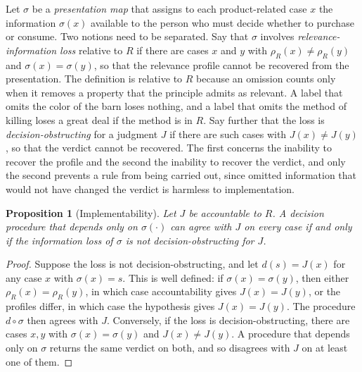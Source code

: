 \documentclass[11pt]{article}
\theoremstyle{definition}
\theoremstyle{plain}
\newtheorem{proposition}[definition]{Proposition}
\theoremstyle{definition}
\newcommand{\Judg}{J}
\newcommand{\prof}{\rho}
\newcommand{\Rel}{R}
\begin{document}
Let $\sigma$ be a \emph{presentation map} that assigns to each product-related case $x$ the information $\sigma(x)$ available to the person who must decide whether to purchase or consume. Two notions need to be separated. Say that $\sigma$ involves \emph{relevance-information loss} relative to $\Rel$ if there are cases $x$ and $y$ with $\prof_{\Rel}(x)\neq\prof_{\Rel}(y)$ and $\sigma(x)=\sigma(y)$, so that the relevance profile cannot be recovered from the presentation. The definition is relative to $\Rel$ because an omission counts only when it removes a property that the principle admits as relevant. A label that omits the color of the barn loses nothing, and a label that omits the method of killing loses a great deal if the method is in $\Rel$. Say further that the loss is \emph{decision-obstructing} for a judgment $\Judg$ if there are such cases with $\Judg(x)\neq\Judg(y)$, so that the verdict cannot be recovered. The first concerns the inability to recover the profile and the second the inability to recover the verdict, and only the second prevents a rule from being carried out, since omitted information that would not have changed the verdict is harmless to implementation.

\begin{proposition}[Implementability]\label{prop:implementability}
Let $\Judg$ be accountable to $\Rel$. A decision procedure that depends only on $\sigma(\cdot)$ can agree with $\Judg$ on every case if and only if the information loss of $\sigma$ is not decision-obstructing for $\Judg$.
\end{proposition}

\begin{proof}
Suppose the loss is not decision-obstructing, and let $d(s)=\Judg(x)$ for any case $x$ with $\sigma(x)=s$. This is well defined: if $\sigma(x)=\sigma(y)$, then either $\prof_{\Rel}(x)=\prof_{\Rel}(y)$, in which case accountability gives $\Judg(x)=\Judg(y)$, or the profiles differ, in which case the hypothesis gives $\Judg(x)=\Judg(y)$. The procedure $d\circ\sigma$ then agrees with $\Judg$. Conversely, if the loss is decision-obstructing, there are cases $x,y$ with $\sigma(x)=\sigma(y)$ and $\Judg(x)\neq\Judg(y)$. A procedure that depends only on $\sigma$ returns the same verdict on both, and so disagrees with $\Judg$ on at least one of them.
\end{proof}
\end{document}
